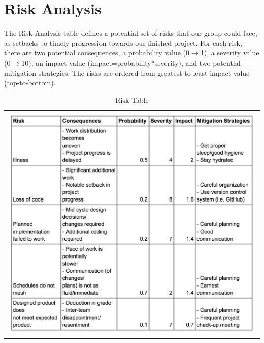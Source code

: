 \chapter{Risk Analysis}
	The Risk Analysis table defines a potential set of risks that our group could face, as setbacks to timely progression towards our finished project. For each risk, there are two potential consequences, a probability value (0$\rightarrow$1), a severity value (0$\rightarrow$10), an impact value (impact=probability*severity), and two potential mitigation strategies. The risks are ordered from greatest to least impact value (top-to-bottom).

\begin{table}[]
\caption{Risk Table}
\label{riskTable}
\begin{tabular}{l}
    \includegraphics[scale = 0.8]{riskTable.png}
\end{tabular}
\end{table}